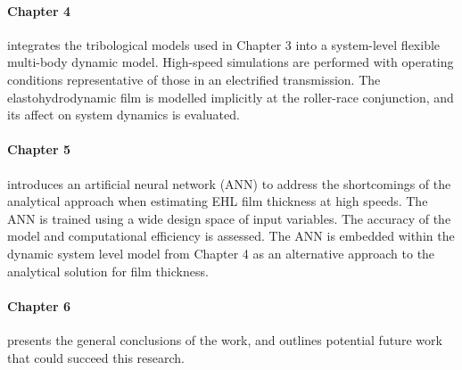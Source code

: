 \paragraph{Chapter 4} integrates the tribological models used in Chapter 3 into a system-level flexible multi-body dynamic model. High-speed simulations are performed with operating conditions representative of those in an electrified transmission. The elastohydrodynamic film is modelled implicitly at the roller-race conjunction, and its affect on system dynamics is evaluated.

\paragraph{Chapter 5} introduces an artificial neural network (ANN) to address the shortcomings of the analytical approach when estimating EHL film thickness at high speeds. The ANN is trained using a wide design space of input variables. The accuracy of the model and computational efficiency is assessed. The ANN is embedded within the dynamic system level model from Chapter 4 as an alternative approach to the analytical solution for film thickness. 

\paragraph{Chapter 6} presents the general conclusions of the work, and outlines potential future work that could succeed this research.